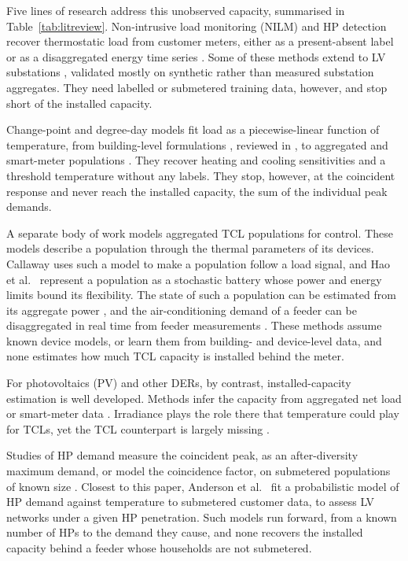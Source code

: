 

Five lines of research address this unobserved capacity, summarised in Table~\ref{tab:litreview}. Non-intrusive load monitoring (NILM) and HP detection recover thermostatic load from customer meters, either as a present-absent label \cite{Fei13, Wei20b, Ray19} or as a disaggregated energy time series \cite{Bru23, Gis26}. Some of these methods extend to LV substations \cite{Wan20, Oma24}, validated mostly on synthetic rather than measured substation aggregates. They need labelled or submetered training data, however, and stop short of the installed capacity.

Change-point and degree-day models fit load as a piecewise-linear function of temperature, from building-level formulations \cite{Fel08, Ruc92, Kis04}, reviewed in \cite{Faz16}, to aggregated and smart-meter populations \cite{Ali11, Per17b, Mac19}. They recover heating and cooling sensitivities and a threshold temperature without any labels. They stop, however, at the coincident response and never reach the installed capacity, the sum of the individual peak demands.

A separate body of work models aggregated TCL populations for control. These models describe a population through the thermal parameters of its devices. Callaway \cite{Cal09} uses such a model to make a population follow a load signal, and Hao et al.\ \cite{Hao15} represent a population as a stochastic battery whose power and energy limits bound its flexibility. The state of such a population can be estimated from its aggregate power \cite{Mat13}, and the air-conditioning demand of a feeder can be disaggregated in real time from feeder measurements \cite{Led18}. These methods assume known device models, or learn them from building- and device-level data, and none estimates how much TCL capacity is installed behind the meter.

For photovoltaics (PV) and other DERs, by contrast, installed-capacity estimation is well developed. Methods infer the capacity from aggregated net load or smart-meter data \cite{Was21, Liu22, Gou25, gouveia2026pvcapacity}. Irradiance plays the role there that temperature could play for TCLs, yet the TCL counterpart is largely missing \cite{Gou26}.

Studies of HP demand measure the coincident peak, as an after-diversity maximum demand, or model the coincidence factor, on submetered populations of known size \cite{Lov17, Che21b, Rou23}. Closest to this paper, Anderson et al.\ \cite{And20} fit a probabilistic model of HP demand against temperature to submetered customer data, to assess LV networks under a given HP penetration. Such models run forward, from a known number of HPs to the demand they cause, and none recovers the installed capacity behind a feeder whose households are not submetered.

